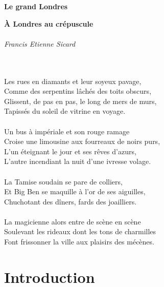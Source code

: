 \documentclass{article}
\begin{document}
\newpage
\vspace*{\fill}
\begin{flushright}\Huge{\textbf{Le grand Londres}}\end{flushright}
\vspace*{\fill}

\newpage

\vspace*{\fill}
\begin{flushleft}

\huge{\textbf{À Londres au crépuscule}}
\ \\ \ \\
\small{\textit{Francis Etienne Sicard}}

\ \\ \ \\
Les rues en diamants et leur soyeux pavage,\\
Comme des serpentins lâchés des toits obscurs,\\
Glissent, de pas en pas, le long de mers de murs,\\
Tapissés du soleil de vitrine en voyage.
\ \\ \ \\
Un bus à impériale et son rouge ramage\\
Croise une limousine aux fourreaux de noirs purs,\\
L’un éteignant le jour et ses rêves d’azurs,\\
L’autre incendiant la nuit d’une ivresse volage.
\ \\ \ \\
La Tamise soudain se pare de colliers,\\
Et Big Ben se maquille à l’or de ses aiguilles,\\
Chuchotant des dîners, fards des joailliers.
\ \\ \ \\
La magicienne alors entre de scène en scène\\
Soulevant les rideaux dont les tons de charmilles\\
Font frissonner la ville aux plaisirs des mécènes.\\
\end{flushleft}
\vspace*{5mm}


\newpage    
\tableofcontents
\newpage
\setcounter{page}{1}
\pagestyle{fancy}
\section{Introduction}
\end{document}
